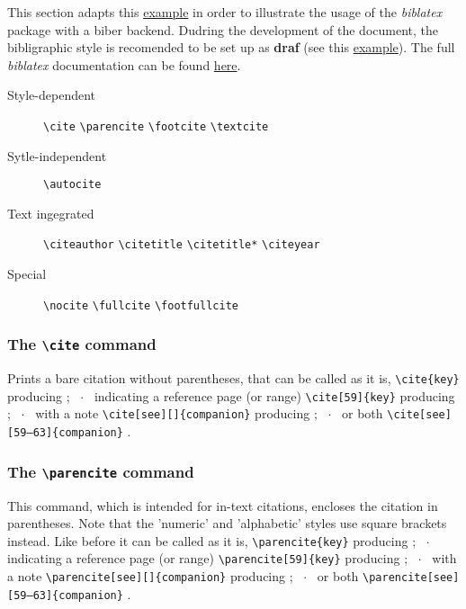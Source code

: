 %
% 
%
\newcommand{\cmd}[1]{\texttt{\textbackslash #1}}
\setlength{\parindent}{0pt}

This section adapts this
\href{http://www.ctan.org/tex-archive/macros/latex/contrib/biblatex/doc/examples/01-introduction.tex}{example}
in order to illustrate the usage of the \emph{biblatex} package with a biber backend.
Dudring the development of the document, the bibligraphic style is recomended to be set up as \textbf{draf}
(see this \href{http://mirrors.ircam.fr/pub/CTAN/macros/latex/contrib/biblatex/doc/examples/81-style-draft.pdf}{example}).
The full \emph{biblatex} documentation can be found \href{http://www.ctan.org/pkg/biblatex}{here}.

\begin{description}
  \item [Style-dependent] \cmd{cite} \cmd{parencite} \cmd{footcite} \cmd{textcite}
  \item [Sytle-independent] \cmd{autocite}
  \item [Text ingegrated] \cmd{citeauthor} \cmd{citetitle} \cmd{citetitle*} \cmd{citeyear}
  \item [Special] \cmd{nocite} \cmd{fullcite} \cmd{footfullcite}
\end{description}

\subsubsection*{The \cmd{cite} command}

Prints a bare citation without parentheses, that can be called
as it is, \cmd{cite\{key\}} producing \cite{companion};
~$\cdot$~
indicating a reference page (or range) \cmd{cite[59]\{key\}} producing \cite[59]{companion};
~$\cdot$~
with a note \cmd{cite[see][]\{companion\}} producing \cite[see][]{companion};
~$\cdot$~
or both \cmd{cite[see][59--63]\{companion\}} \cite[see][59--63]{companion}.

\subsubsection*{The \cmd{parencite} command}

This command, which is intended for in-text citations,
encloses the citation in parentheses. Note that the 'numeric' and
'alphabetic' styles use square brackets instead.
Like before it can be called as it is, \cmd{parencite\{key\}} producing \parencite{companion};
~$\cdot$~
indicating a reference page (or range) \cmd{parencite[59]\{key\}} producing \parencite[59]{companion};
~$\cdot$~
with a note \cmd{parencite[see][]\{companion\}} producing \parencite[see][]{companion};
~$\cdot$~
or both \cmd{parencite[see][59--63]\{companion\}} \parencite[see][59--63]{companion}.

